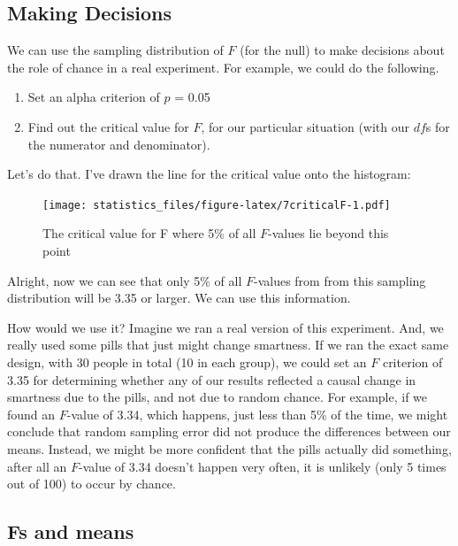 \documentclass[]{book}
\providecommand{\tightlist}{%
  \setlength{\itemsep}{0pt}\setlength{\parskip}{0pt}}
\begin{document}
\hypertarget{making-decisions}{%
\subsection{Making Decisions}\label{making-decisions}}

We can use the sampling distribution of \(F\) (for the null) to make decisions about the role of chance in a real experiment. For example, we could do the following.

\begin{enumerate}
\def\labelenumi{\arabic{enumi}.}
\tightlist
\item
  Set an alpha criterion of \(p\) = 0.05
\item
  Find out the critical value for \(F\), for our particular situation (with our \(df\)s for the numerator and denominator).
\end{enumerate}

Let's do that. I've drawn the line for the critical value onto the histogram:

\begin{figure}
\centering
\texttt{[image: statistics\_files/figure-latex/7criticalF-1.pdf]}
\caption{\label{fig:7criticalF}The critical value for F where 5\% of all \(F\)-values lie beyond this point}
\end{figure}

Alright, now we can see that only 5\% of all \(F\)-values from from this sampling distribution will be 3.35 or larger. We can use this information.

How would we use it? Imagine we ran a real version of this experiment. And, we really used some pills that just might change smartness. If we ran the exact same design, with 30 people in total (10 in each group), we could set an \(F\) criterion of 3.35 for determining whether any of our results reflected a causal change in smartness due to the pills, and not due to random chance. For example, if we found an \(F\)-value of 3.34, which happens, just less than 5\% of the time, we might conclude that random sampling error did not produce the differences between our means. Instead, we might be more confident that the pills actually did something, after all an \(F\)-value of 3.34 doesn't happen very often, it is unlikely (only 5 times out of 100) to occur by chance.

\hypertarget{fs-and-means}{%
\subsection{Fs and means}\label{fs-and-means}}
\end{document}
